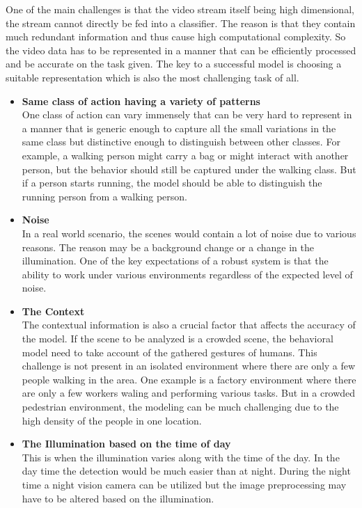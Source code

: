 \documentclass[a4paper,12pt]{report}
\begin{document}
One of the main challenges is that the video stream itself being high dimensional, the stream cannot directly be fed into a classifier. The reason is that they contain much redundant information and thus cause high computational complexity.  So the video data has to be represented in a manner that can be efficiently processed and be accurate on the task given.  The key to a successful model is choosing a suitable representation which is also the most challenging task of all. 
\begin{itemize}
    \item \textbf{Same class of action having a variety of patterns} \\ 
One class of action can vary immensely that can be very hard to represent in a manner that is generic enough to capture all the small variations in the same class but distinctive enough to distinguish between other classes.  For example, a walking person might carry a bag or might interact with another person, but the behavior should still be captured under the walking class. But if a person starts running, the model should be able to distinguish the running person from a walking person.

\item \textbf{Noise} \\
In a real world scenario, the scenes would contain a lot of noise due to various reasons.  The reason may be a background change or a change in the illumination.  One of the key expectations of a robust system is that the ability to work under various environments regardless of the expected level of noise. 
\item \textbf{The Context} \\
The contextual information is also a crucial factor that affects the accuracy of the model. If the scene to be analyzed is a crowded scene, the behavioral model need to take account of the gathered gestures of humans. This challenge is not present in an isolated environment where there are only a few people walking in the area. One example is a factory environment where there are only a few workers waling and performing various tasks. But in a crowded pedestrian environment, the modeling can be much challenging due to the high density of the people in one location.
\item \textbf{The Illumination based on the time of day} \\
This is when the illumination varies along with the time of the day. In the day time the detection would be much easier than at night. During the night time a night vision camera can be utilized but the image preprocessing may have to be altered based on the illumination. 

\end{itemize}
	
\end{document}
